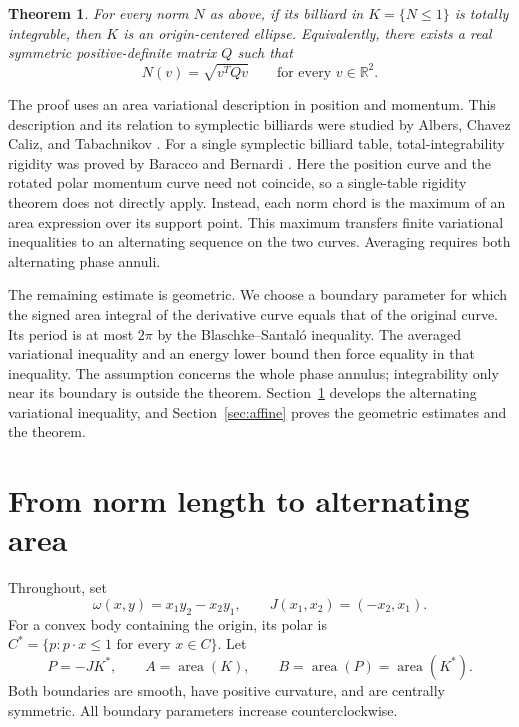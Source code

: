 \documentclass[11pt]{amsart}
\newtheorem{theorem}{Theorem}[section]
\theoremstyle{remark}
\newcommand{\R}{\mathbb R}
\newcommand{\area}{\operatorname{area}}
\begin{document}
\begin{theorem}\label{thm:main}
For every norm $N$ as above, if its billiard in $K=\{N\leq1\}$ is totally
integrable, then $K$ is an origin-centered ellipse. Equivalently, there
exists a real symmetric positive-definite matrix $Q$ such that
\[
N(v)=\sqrt{v^TQv}\qquad\text{for every }v\in\R^2.
\]
\end{theorem}

The proof uses an area variational description in position and momentum.
This description and its relation to symplectic billiards were studied
by Albers, Chavez Caliz, and Tabachnikov \cite[Sections 2--3]{ACT}.
For a single symplectic billiard table, total-integrability rigidity
was proved by Baracco and Bernardi \cite[Theorem 1.1]{BB}.
Here the position curve and the rotated polar momentum curve need not
coincide, so a single-table rigidity theorem does not directly apply.
Instead, each norm chord is the maximum of an area expression over its
support point. This maximum transfers finite variational inequalities
to an alternating sequence on the two curves. Averaging requires both
alternating phase annuli.

The remaining estimate is geometric. We choose a boundary parameter for
which the signed area integral of the derivative curve equals that of
the original curve. Its period is at most $2\pi$ by the
Blaschke--Santal\'o inequality. The averaged variational inequality and
an energy lower bound then force equality in that inequality.
The assumption concerns the whole phase annulus; integrability only
near its boundary is outside the theorem.
Section~\ref{sec:area} develops the alternating variational inequality,
and Section~\ref{sec:affine} proves the geometric estimates and the theorem.

\section{From norm length to alternating area}\label{sec:area}

Throughout, set
\[
\omega(x,y)=x_1y_2-x_2y_1,\qquad J(x_1,x_2)=(-x_2,x_1).
\]
For a convex body containing the origin, its polar is
$C^*=\{p:p\cdot x\leq1\text{ for every }x\in C\}$.
Let
\begin{equation}\label{eq:bodies}
P=-JK^*,\qquad A=\area(K),\qquad B=\area(P)=\area(K^*).
\end{equation}
Both boundaries are smooth, have positive curvature, and are centrally
symmetric. All boundary parameters increase counterclockwise.
\end{document}
